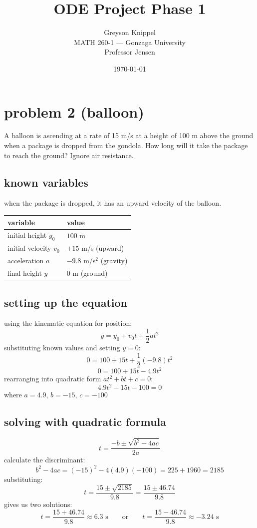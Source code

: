 \documentclass[12pt]{article}
\title{ODE Project Phase 1}
\author{
Greyson Knippel \\[4pt]
MATH 260-1 --- Gonzaga University \\[4pt]
Professor Jensen
}
\date{\today}
\begin{document}
\maketitle

\section*{problem 2 (balloon)}


A balloon is ascending at a rate of 15 m/s at a height of 100 m above the ground when a package
is dropped from the gondola. How long will it take the package to reach the ground? Ignore air resistance.

\subsection*{known variables}
when the package is dropped, it has an upward velocity of the balloon.

\begin{center}
\begin{tabular}{ll}
    \hline
    variable & value \\
    \hline
    initial height $y_0$ & $100$ m \\
    initial velocity $v_0$ & $+15$ m/s (upward) \\
    acceleration $a$ & $-9.8$ m/s$^2$ (gravity) \\
    final height $y$ & $0$ m (ground) \\
    \hline
\end{tabular}
\end{center}

\subsection*{setting up the equation}
using the kinematic equation for position:
\[
y = y_0 + v_0 t + \frac{1}{2}at^2
\]
substituting known values and setting $y = 0$:
\[
0 = 100 + 15t + \frac{1}{2}(-9.8)t^2
\]
\[
0 = 100 + 15t - 4.9t^2
\]
rearranging into quadratic form $at^2 + bt + c = 0$:
\[
4.9t^2 - 15t - 100 = 0
\]
where $a = 4.9$, $b = -15$, $c = -100$

\subsection*{solving with quadratic formula}
\[
t = \frac{-b \pm \sqrt{b^2 - 4ac}}{2a}
\]
calculate the discriminant:
\[
b^2 - 4ac = (-15)^2 - 4(4.9)(-100) = 225 + 1960 = 2185
\]
substituting:
\[
t = \frac{15 \pm \sqrt{2185}}{9.8} = \frac{15 \pm 46.74}{9.8}
\]
gives us two solutions:
\[
t = \frac{15 + 46.74}{9.8} \approx 6.3 \text{ s} \qquad \text{or} \qquad t = \frac{15 - 46.74}{9.8} \approx -3.24 \text{ s}
\]
\end{document}
